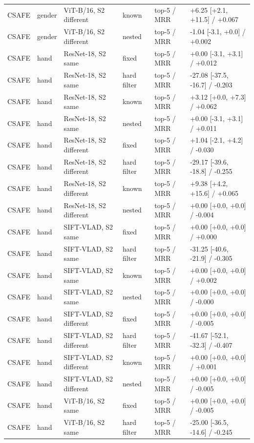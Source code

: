 {\begin{longtable}{llllll}
CSAFE & gender & ViT-B/16, S2 different & known & top-5 / MRR & +6.25 [+2.1, +11.5] / +0.067 \\
CSAFE & gender & ViT-B/16, S2 different & nested & top-5 / MRR & -1.04 [-3.1, +0.0] / +0.002 \\
CSAFE & hand & ResNet-18, S2 same & fixed & top-5 / MRR & +0.00 [-3.1, +3.1] / +0.012 \\
CSAFE & hand & ResNet-18, S2 same & hard filter & top-5 / MRR & -27.08 [-37.5, -16.7] / -0.203 \\
CSAFE & hand & ResNet-18, S2 same & known & top-5 / MRR & +3.12 [+0.0, +7.3] / +0.062 \\
CSAFE & hand & ResNet-18, S2 same & nested & top-5 / MRR & +0.00 [-3.1, +3.1] / +0.011 \\
CSAFE & hand & ResNet-18, S2 different & fixed & top-5 / MRR & +1.04 [-2.1, +4.2] / -0.030 \\
CSAFE & hand & ResNet-18, S2 different & hard filter & top-5 / MRR & -29.17 [-39.6, -18.8] / -0.255 \\
CSAFE & hand & ResNet-18, S2 different & known & top-5 / MRR & +9.38 [+4.2, +15.6] / +0.065 \\
CSAFE & hand & ResNet-18, S2 different & nested & top-5 / MRR & +0.00 [+0.0, +0.0] / -0.004 \\
CSAFE & hand & SIFT-VLAD, S2 same & fixed & top-5 / MRR & +0.00 [+0.0, +0.0] / +0.000 \\
CSAFE & hand & SIFT-VLAD, S2 same & hard filter & top-5 / MRR & -31.25 [-40.6, -21.9] / -0.305 \\
CSAFE & hand & SIFT-VLAD, S2 same & known & top-5 / MRR & +0.00 [+0.0, +0.0] / +0.002 \\
CSAFE & hand & SIFT-VLAD, S2 same & nested & top-5 / MRR & +0.00 [+0.0, +0.0] / -0.000 \\
CSAFE & hand & SIFT-VLAD, S2 different & fixed & top-5 / MRR & +0.00 [+0.0, +0.0] / -0.005 \\
CSAFE & hand & SIFT-VLAD, S2 different & hard filter & top-5 / MRR & -41.67 [-52.1, -32.3] / -0.407 \\
CSAFE & hand & SIFT-VLAD, S2 different & known & top-5 / MRR & +0.00 [+0.0, +0.0] / +0.001 \\
CSAFE & hand & SIFT-VLAD, S2 different & nested & top-5 / MRR & +0.00 [+0.0, +0.0] / -0.005 \\
CSAFE & hand & ViT-B/16, S2 same & fixed & top-5 / MRR & +0.00 [+0.0, +0.0] / -0.005 \\
CSAFE & hand & ViT-B/16, S2 same & hard filter & top-5 / MRR & -25.00 [-36.5, -14.6] / -0.245 \\

\end{longtable}}
